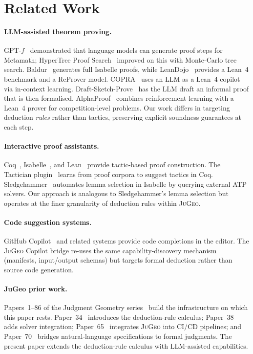 \documentclass[11pt]{article}
\newcommand{\JG}{\textsc{JuGeo}}
\newcommand{\LLM}{\textsc{LLM}}
\begin{document}
\section{Related Work}\label{sec:related}

\paragraph{LLM-assisted theorem proving.}
GPT-$f$~\cite{polu2020gpt} demonstrated that language models can
generate proof steps for Metamath; HyperTree
Proof Search~\cite{lample2022hypertree} improved on this with
Monte-Carlo tree search.  Baldur~\cite{first2023baldur} generates
full Isabelle proofs, while LeanDojo~\cite{yang2024leandojo}
provides a Lean~4 benchmark and a ReProver model.
COPRA~\cite{thakur2024copra} uses an \LLM{} as a Lean~4 copilot
via in-context learning.
Draft-Sketch-Prove~\cite{jiang2023draftsketchprove} has the \LLM{}
draft an informal proof that is then formalised.
AlphaProof~\cite{alphaproof2024} combines reinforcement learning
with a Lean~4 prover for competition-level problems.
Our work differs in targeting deduction \emph{rules} rather than
tactics, preserving explicit soundness guarantees at each step.

\paragraph{Interactive proof assistants.}
Coq~\cite{coq2024}, Isabelle~\cite{nipkow2002isabelle}, and
Lean~\cite{moura2021lean4} provide tactic-based proof
construction.  The Tactician plugin~\cite{blaauwbroek2020tactician}
learns from proof corpora to suggest tactics in Coq.
Sledgehammer~\cite{paulson2010sledgehammer} automates lemma
selection in Isabelle by querying external ATP solvers.
Our approach is analogous to Sledgehammer's lemma selection but
operates at the finer granularity of deduction rules within \JG{}.

\paragraph{Code suggestion systems.}
GitHub Copilot~\cite{chen2021codex} and related systems
provide code completions in the editor.  The \JG{} Copilot bridge
re-uses the same capability-discovery mechanism (manifests,
input/output schemas) but targets formal deduction rather than
source code generation.

\paragraph{JuGeo prior work.}
Papers~1--86 of the Judgment Geometry
series~\cite{young2024jugeo,young2024p34deduction,
young2024p38solver,young2024p65cicd,young2024p70nlspecs} build the
infrastructure on which this paper rests.
Paper~34~\cite{young2024p34deduction} introduces the deduction-rule
calculus; Paper~38~\cite{young2024p38solver} adds solver
integration; Paper~65~\cite{young2024p65cicd} integrates \JG{}
into CI/CD pipelines; and Paper~70~\cite{young2024p70nlspecs}
bridges natural-language specifications to formal judgments.
The present paper extends the deduction-rule calculus with
\LLM{}-assisted capabilities.
\end{document}
